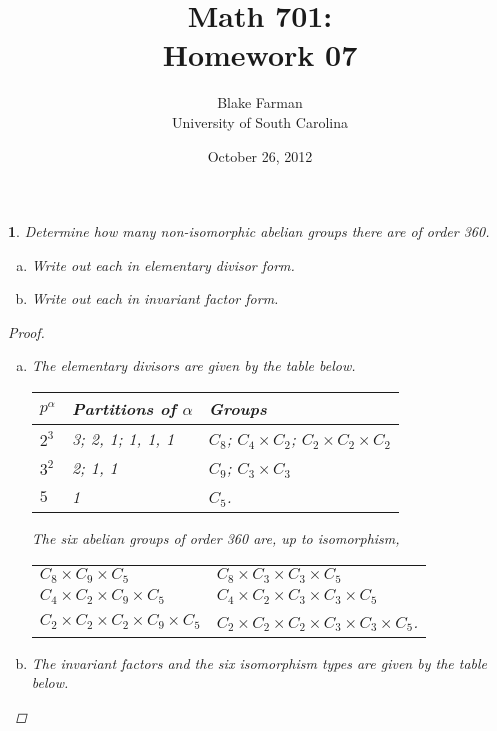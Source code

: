 \documentclass[10pt]{amsart}
\author{Blake Farman\\University of South Carolina}
\title{Math 701:\\Homework 07}
\date{October 26, 2012}
\begin{document}
\maketitle

\newtheorem{thm}{}
\newtheorem*{lem}{Lemma}

\begin{thm}
  Determine how many non-isomorphic abelian groups there are of order 360.
  \begin{enumerate}[(a)]
  \item
    Write out each in elementary divisor form.
  \item
    Write out each in invariant factor form.
  \end{enumerate}
  
  \begin{proof}
    \begin{enumerate}[(a)]
    \item
      The elementary divisors are given by the table below.\\
      \begin{center}
        \begin{tabular}{l| l | l}
          $p^\alpha$ & Partitions of $\alpha$ & Groups\\
          \hline
          $2^3$ & 3; 2, 1; 1, 1, 1 & $C_8$; $C_4 \times C_2$; $C_2 \times C_2 \times C_2$\\
          $3^2$ & 2; 1, 1 & $C_9$; $C_3 \times C_3$\\
          $5$ & 1 & $C_5$.
        \end{tabular}
      \end{center}
      The six abelian groups of order 360 are, up to isomorphism,\\
      \begin{center}
        \begin{tabular}{l l}
          $C_8 \times C_9 \times C_5$ & $C_8 \times C_3 \times C_3 \times C_5$\\
          $C_4 \times C_2 \times C_9 \times C_5$ & $C_4 \times C_2 \times C_3 \times C_3 \times C_5$\\
          $C_2 \times C_2 \times C_2 \times C_9 \times C_5$ & $C_2 \times C_2 \times C_2 \times C_3 \times C_3 \times C_5$.
        \end{tabular}
      \end{center}
    \item
      The invariant factors and the six isomorphism types are given by the table below.\\

\end{enumerate}
\end{proof}
\end{thm}
\end{document}
